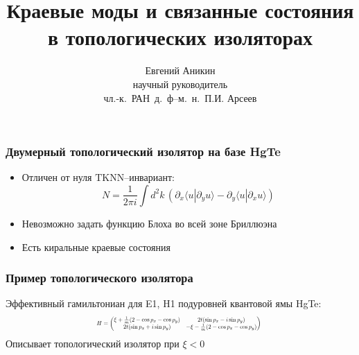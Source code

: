 \documentclass{beamer}
\title{Краевые моды и связанные состояния в топологических изоляторах}
\author[Е. Аникин]{Евгений Аникин \\
	научный руководитель\\
	чл.-к.~РАН~д.~ф--м.~н.~П.И. Арсеев}
\institute{ФИАН им. Лебедева}
\date{}
\begin{document}
\begin{frame}
    \titlepage
\end{frame}

\begin{frame}
    \frametitle{Двумерный топологический изолятор на базе HgTe}
    \begin{itemize}
        \item Отличен от нуля $\mathrm{TKNN}$--инвариант:
            \begin{equation}
                \label{TKNN}
                N = \frac{1}{2\pi i} 
                    \int d^2 k\, \left(\partial_x \langle u | \partial_y u \rangle -
                    \partial_y \langle u | \partial_x u \rangle \right)
            \end{equation}
        \item Невозможно задать функцию Блоха во всей зоне Бриллюэна
        \item Есть киральные краевые состояния
    \end{itemize}
\end{frame}

\begin{frame}
    \frametitle{Пример топологического изолятора}
        Эффективный гамильтониан для E1, H1 подуровней квантовой ямы HgTe:
        \begin{equation}
           \label{eff_so_ham}
            \scalebox{0.6}{%
            $
            H = \left(\begin{matrix}
                    \xi + \frac{1}{m}(2 - \cos{p_x} - \cos{p_y}) & 
                            2t(\sin{p_x} - i\sin{p_y})   \\
                    2t(\sin{p_x} + i\sin{p_y}) & 
                           - \xi - \frac{1}{m}(2 - \cos{p_x} - \cos{p_y}) \\
                \end{matrix}\right)
            $
            }
        \end{equation}
        Описывает топологический изолятор при $\xi < 0$
\end{frame}
\end{document}
